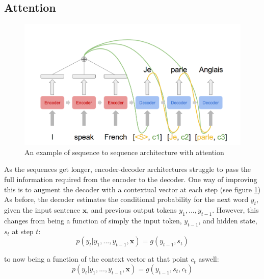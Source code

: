 


\subsection{Attention} %

\begin{figure}[tb]{}
    \centering
    \includegraphics[width=\linewidth]{ModelPics/attention3.png}
    \caption{An example of sequence to sequence architecture with attention}
    \label{fig:attention}
\end{figure}


As the sequences get longer, encoder-decoder architectures struggle to pass the full information required from the encoder to the decoder. 
One way of improving this is to augment the decoder with a contextual vector at each step (see figure \ref{fig:attention})
As before, the decoder estimates the conditional probability for the next word $y_t$, given the input sentence $\mathbf{x}$, and previous output tokens ${y_1, ..., y_{t-1}}$.
 However, this changes from being a function of simply the input token, $y_{t-1}$, and hidden state, $s_{t}$ at step $t$:
\begin{equation}
p(y_t| y_1, ..., y_{t-1}, \mathbf{x} ) = g(y_{t-1}, s_t)
\end{equation}

to now being a function of the context vector at that point $c_t$ aswell:
\begin{equation}
p(y_t| y_1, ..., y_{t-1}, \mathbf{x} ) = g(y_{t-1}, s_t, c_t)
\end{equation}


